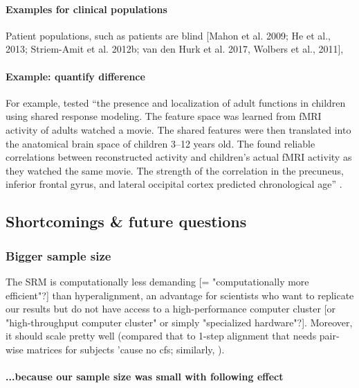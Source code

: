 \paragraph{Examples for clinical populations}

%
Patient populations, such as patients are blind
%
[Mahon et al. 2009; He et al., 2013; Striem-Amit et al. 2012b; van den Hurk et
al. 2017, Wolbers et al., 2011],
%

\paragraph{Example: \citet{yates2021emergence} quantify difference}


For example, \citet{yates2021emergence} tested ``the presence and localization
of adult functions in children using shared response modeling.
%
The feature space was learned from fMRI activity of adults watched a movie.
%
The shared features were then translated into the anatomical brain space of
children 3--12 years old.
%
The found reliable correlations between reconstructed activity and children's
actual fMRI activity as they watched the same movie.
%
The strength of the correlation in the precuneus, inferior frontal gyrus, and
lateral occipital cortex predicted chronological age''
\citep{yates2021emergence}.



\subsection{Shortcomings \& future questions}

\subsubsection{Bigger sample size}
%
The SRM is computationally less demanding [= "computationally more efficient"?]
than hyperalignment, an advantage for scientists who want to replicate our
results but do not have access to a high-performance computer cluster [or
"high-throughput computer cluster" or simply "specialized hardware"?].
%
Moreover, it should scale pretty well (compared that to
\citep{jiahui2020predicting, jiahui2022cross} 1-step alignment that needs
pair-wise matrices for subjects 'cause no \ac{cfs}; similarly,
\citep{busch2021hybrid}).


\paragraph{...because our sample size was small with following effect}

